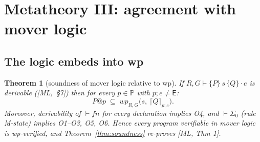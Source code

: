 \documentclass[11pt]{article}
\theoremstyle{plain}
\newtheorem{theorem}{Theorem}
\theoremstyle{plain}
\theoremstyle{definition}
\newcommand{\Phase}{\mathbb{P}}
\newcommand{\ME}{\mathsf{E}}
\newcommand{\wpx}{\mathit{wp}}
\newcommand{\upemb}[2]{\lceil #1\rceil_{#2}}     %
\newcommand{\mljud}[6]{#1,#2\vdash\{#3\}\,#4\,\{#5\}\cdot #6}
\begin{document}
\section{Metatheory III: agreement with mover logic}\label{sec:meta3}

\subsection{The logic embeds into wp}

\begin{theorem}[soundness of mover logic relative to wp]\label{thm:embed}
If $\mljud{R}{G}{P}{s}{Q}{e}$ is derivable ([ML,~\S7]) then for every $p\in\Phase$
with $p;e\neq\ME$:
\[
P@p \;\subseteq\; \wpx_{R,G}\bigl(s,\ \upemb{Q}{p;e}\bigr).
\]
Moreover, derivability of $\vdash \mathit{fn}$ for every declaration implies O4,
and $\vdash\Sigma_0$ (rule M-state) implies O1--O3, O5, O6. Hence every program
verifiable in mover logic is wp-verified, and Theorem~\ref{thm:soundness}
re-proves [ML, Thm 1].
\end{theorem}
\end{document}
